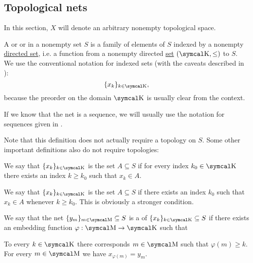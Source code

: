 \subsection{Topological nets}\label{subsec:topological_nets}

In this section, \( X \) will denote an arbitrary nonempty topological space.

\begin{definition}\label{def:topological_net}
  A  or  or  in a nonempty set \( S \) is a family of elements of \( S \) indexed by a nonempty \hyperref[def:indexed_family]{directed set}, i.e. a function from a nonempty directed \hyperref[def:directed_set]{set} \( (\CK, \leq) \) to \( S \). We use the conventional notation for indexed sets (with the caveats described in ):
  \begin{equation*}
    \{ x_k \}_{k \in \CK},
  \end{equation*}
  because the preorder on the domain \( \CK \) is usually clear from the context.

  If we know that the net is a sequence, we will usually use the notation for sequences given in .

  Note that this definition does not actually require a topology on \( S \). Some other important definitions also do not require topologies:
  \begin{DefEnum}
     We say that \( \{ x_k \}_{k \in \CK} \) is  the set \( A \subseteq S \) if for every index \( k_0 \in \CK \) there exists an index \( k \geq k_0 \) such that \( x_k \in A \).

     We say that \( \{ x_k \}_{k \in \CK} \) is  the set \( A \subseteq S \) if there exists an index \( k_0 \) such that \( x_k \in A \) whenever \( k \geq k_0 \). This is obviously a stronger condition.

    We say that the net \( \{ y_m \}_{m \in \CM} \subseteq S \) is a  of \( \{ x_k \}_{k \in \CK} \subseteq S \) if there exists an embedding function \( \varphi: \CM \to \CK \) such that
    \begin{DefEnum}
       To every \( k \in \CK \) there corresponds \( m \in \CM \) such that \( \varphi(m) \geq k \).
       For every \( m \in \CM \) we have \( x_{\varphi(m)} = y_m \).
    \end{DefEnum}
  \end{DefEnum}
\end{definition}

